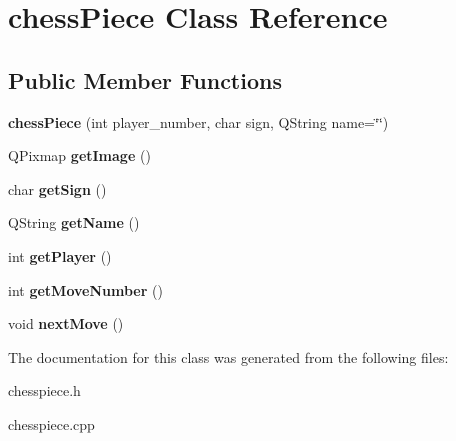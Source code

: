 \hypertarget{classchessPiece}{}\section{chess\+Piece Class Reference}
\label{classchessPiece}
\subsection*{Public Member Functions}
\begin{DoxyCompactItemize}
\item 
\mbox{\label{classchessPiece_a2045dacd528cc380a1776d851b4583c8}} 
{\bfseries chess\+Piece} (int player\+\_\+number, char sign, Q\+String name=\char`\"{}\char`\"{})
\item 
\mbox{\label{classchessPiece_ae86984a51801d6f7bcd227e725084df4}} 
Q\+Pixmap {\bfseries get\+Image} ()
\item 
\mbox{\label{classchessPiece_acbc5b0aaf67995a864197e73842845dc}} 
char {\bfseries get\+Sign} ()
\item 
\mbox{\label{classchessPiece_a112a342de4a58271b658615800f50ea2}} 
Q\+String {\bfseries get\+Name} ()
\item 
\mbox{\label{classchessPiece_a3a46c87ea362e4fa3204c3f257d7f439}} 
int {\bfseries get\+Player} ()
\item 
\mbox{\label{classchessPiece_a496f4a51efbb1287138d3dd94bf2cbdf}} 
int {\bfseries get\+Move\+Number} ()
\item 
\mbox{\label{classchessPiece_ab72882d27eb8f5ce67f0a7eff059e3ff}} 
void {\bfseries next\+Move} ()
\end{DoxyCompactItemize}


The documentation for this class was generated from the following files\+:\begin{DoxyCompactItemize}
\item 
chesspiece.\+h\item 
chesspiece.\+cpp\end{DoxyCompactItemize}
